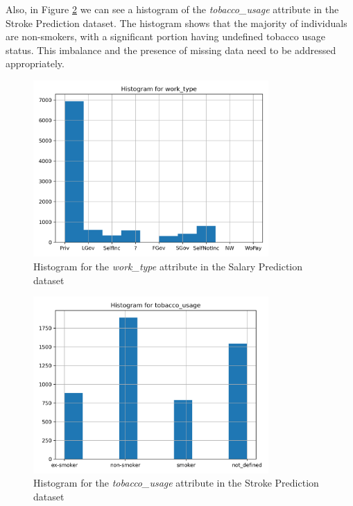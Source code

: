 \documentclass[runningheads]{paper}
\begin{document}
Also, in Figure \ref{fig:histogram_example_stroke} we can see a histogram of the
\textit{tobacco\_usage} attribute in the Stroke Prediction dataset. The histogram 
shows that the majority of individuals are non-smokers, with a significant portion 
having undefined tobacco usage status. This imbalance and the presence of missing 
data need to be addressed appropriately.

\begin{figure}[H]
    \centering
    \includegraphics[width=0.8\textwidth]{../plots/histogram_work_type_SalaryPrediction_full.png}
    \caption{Histogram for the \textit{work\_type} attribute in the Salary Prediction dataset}
    \label{fig:histogram_example_salary}
\end{figure}

\begin{figure}[H]
    \centering
    \includegraphics[width=0.8\textwidth]{../plots/histogram_tobacco_usage_AVC_full.png}
    \caption{Histogram for the \textit{tobacco\_usage} attribute in the Stroke Prediction dataset}
    \label{fig:histogram_example_stroke}
\end{figure}
\end{document}
